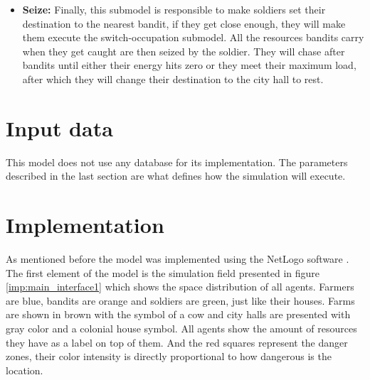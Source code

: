 \documentclass{wscpaperproc}
\begin{document}
\begin{itemize}
    \item \textbf{Seize:} Finally, this submodel is responsible to make
    soldiers set their destination to the nearest bandit, if they get close
    enough, they will make them execute the switch-occupation submodel. All
    the resources bandits carry when they get caught are then seized by the
    soldier. They will chase after bandits until either their energy hits zero
    or they meet their maximum load, after which they will change their
    destination to the city hall to rest.

\end{itemize}

\section{Input data}

This model does not use any database for its implementation. The parameters
described in the last section are what defines how the simulation will execute.

\section{Implementation}

As mentioned before the model was implemented using the NetLogo software
\cite{netlogo}. The first element of the model is the simulation field
presented in figure \ref{imp:main_interface1} which shows the space distribution
of all agents. Farmers are blue, bandits are orange and soldiers are
green, just like their houses. Farms are shown in brown with the symbol of a cow
and city halls are presented with gray color and a colonial house symbol. All
agents show the amount of resources they have as a label on top of them. And the
red squares represent the danger zones, their color intensity is directly
proportional to how dangerous is the location.

\newpage
\end{document}
